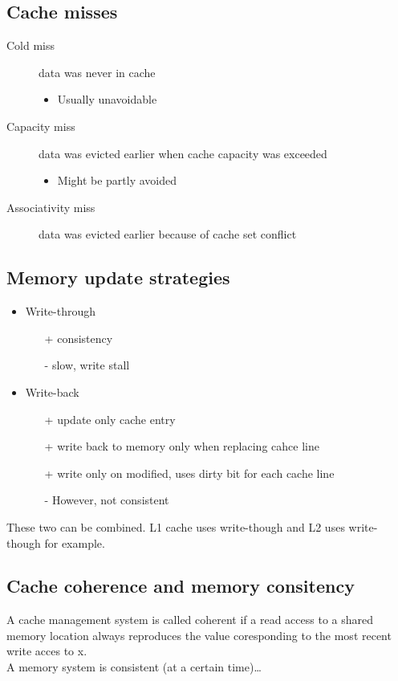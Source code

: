 \documentclass[a4paper]{article}
\begin{document}
\subsection{Cache misses}
\begin{description}
    \item[Cold miss] data was never in cache
        \begin{itemize}
            \item Usually unavoidable
        \end{itemize}
    \item[Capacity miss] data was evicted earlier when cache capacity was exceeded
        \begin{itemize}
            \item Might be partly avoided
        \end{itemize}
    \item[Associativity miss] data was evicted earlier because of cache set conflict
\end{description}
\subsection{Memory update strategies}
\begin{itemize}
    \item Write-through
        \begin{itemize}
            \item[+] consistency
            \item[-] slow, write stall
        \end{itemize}
    \item Write-back
        \begin{itemize}
            \item[+] update only cache entry
            \item[+] write back to memory only when replacing cahce line
            \item[+] write only on modified, uses dirty bit for each cache line
            \item[-] However, not consistent
        \end{itemize}
\end{itemize}
These two can be combined. L1 cache uses write-though and L2 uses write-though
for example.
\subsection{Cache coherence and memory consitency}
A cache management system is called coherent if a read access to a shared memory
location
always reproduces the value coresponding to the  most recent write acces to x.
\\
A memory system is consistent (at a certain time)\ldots
\end{document}
